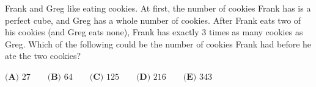 Frank and Greg like eating cookies. At first, the number of cookies Frank has is a perfect cube, and Greg has a whole number of cookies. After Frank eats two of his cookies (and Greg eats none), Frank has exactly $3$ times as many cookies as Greg. Which of the following could be the number of cookies Frank had before he ate the two cookies?

$\textbf{(A) }27\qquad\textbf{(B) }64\qquad\textbf{(C) }125\qquad\textbf{(D) }216\qquad\textbf{(E) }343$
